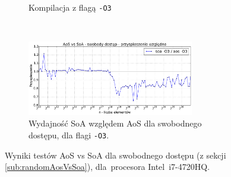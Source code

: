 \begin{figure}[!h]
\begin{subfigure}[c]{0.45\textwidth}
        \caption{Kompilacja z flagą \texttt{-O3}}
    \end{subfigure}
    \\
    \vspace{0.55cm}
    \begin{subfigure}[c]{1.0\textwidth}
        \centering
        \includegraphics[width=0.80\textwidth]{images/benchs/random_access_aos_vs_soa_normalized}
        \caption{Wydajność SoA względem AoS dla swobodnego dostępu, dla flagi \texttt{-O3}.}
        \label{fig:randomAosVsSoaRelative}
    \end{subfigure}
    \caption{Wyniki testów AoS vs SoA dla swobodnego dostępu (z sekcji \ref{sub:randomAosVsSoa}), dla~procesora \mbox{Intel i7-4720HQ}.}
    \label{fig:randomAosVsSoa}
\end{figure}

\clearpage

